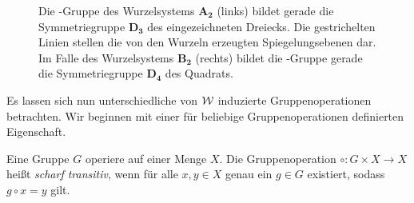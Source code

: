 \begin{figure}
  \centering
  \label{fig:symmetry}
  \hspace{1cm}
  \caption{Die \weyl\hyp{}Gruppe des Wurzelsystems $\mathbf{A_2}$ (links) bildet gerade die Symmetriegruppe $\mathbf{D_3}$ des eingezeichneten Dreiecks. Die gestrichelten Linien stellen die von den Wurzeln erzeugten Spiegelungsebenen dar. Im Falle des Wurzelsystems $\mathbf{B_2}$ (rechts) bildet die \weyl\hyp{}Gruppe gerade die Symmetriegruppe $\mathbf{D_4}$ des Quadrats.}
\end{figure}

Es lassen sich nun unterschiedliche von $\mathcal{W}$ induzierte Gruppenoperationen betrachten. 
Wir beginnen mit einer für beliebige Gruppenoperationen definierten Eigenschaft.

\begin{defn}
  Eine Gruppe $G$ operiere auf einer Menge $X$.
  Die Gruppenoperation $\circ \colon G \times X \to X$ heißt \emph{scharf transitiv}, wenn für alle $x,y \in X$ genau ein $g \in G$ existiert, sodass $g \circ x = y$ gilt. 
\end{defn}

